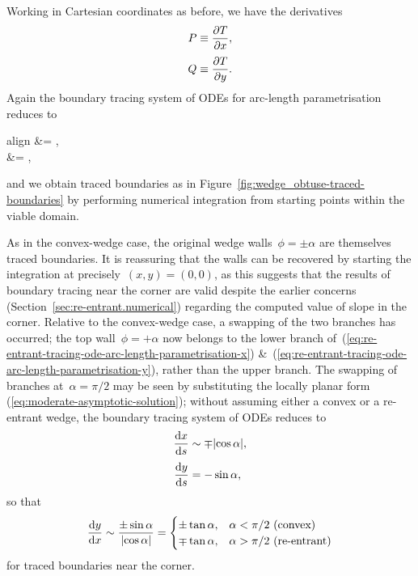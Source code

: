 \begin{figure}
\end{figure}

Working in Cartesian coordinates as before,
we have the derivatives
\begin{align}
  P &\ideq \pder{T}{x},
    \label{eq:re-entrant-gradient-x-component} \\[\tallspace]
  Q &\ideq \pder{T}{y}.
    \label{eq:re-entrant-gradient-y-component}
\end{align}
Again the boundary tracing system of ODEs for arc-length parametrisation
reduces to
\begin{important}{align}
   &= ,
    \label{eq:re-entrant-tracing-ode-arc-length-parametrisation-x}
    \\[\tallspace]
   &= ,
    \label{eq:re-entrant-tracing-ode-arc-length-parametrisation-y}
\end{important}
and we obtain traced boundaries
as in Figure~\ref{fig:wedge_obtuse-traced-boundaries}
by performing numerical integration
from starting points within the viable domain.

As in the convex-wedge case,
the original wedge walls~$\phi = \pm\alpha$
are themselves traced boundaries.
It is reassuring that the walls can be recovered
by starting the integration at precisely~$(x, y) = (0, 0)$,
as this suggests that the results of boundary tracing near the corner
are valid
despite the earlier concerns (Section~\ref{sec:re-entrant.numerical})
regarding the computed value of slope in the corner.
Relative to the convex-wedge case,
a swapping of the two branches has occurred;
the top wall~$\phi = +\alpha$ now belongs to the lower branch
of~(\ref{eq:re-entrant-tracing-ode-arc-length-parametrisation-x})
\&~(\ref{eq:re-entrant-tracing-ode-arc-length-parametrisation-y}),
rather than the upper branch.
The swapping of branches at~$\alpha = \pi/2$ may be seen
by substituting the locally planar form~%
  (\ref{eq:moderate-asymptotic-solution});
without assuming either a convex or a re-entrant wedge,
the boundary tracing system of ODEs reduces to
\begin{align}
  \tder{x}{s} &\asy \mp \abs{\cos\alpha},
    \label{eq:planar-asymptotic-tracing-ode-arc-length-parametrisation-x}
    \\[\tallspace]
  \tder{y}{s} &= -\sin\alpha,
    \label{eq:planar-asymptotic-tracing-ode-arc-length-parametrisation-y}
\end{align}
so that
\begin{equation}
  \tder{y}{x} \asy \frac{\pm\sin\alpha}{\abs{\cos\alpha}} =
    \begin{cases}
      \pm\tan\alpha, &\text{$\alpha < \pi/2$ (convex)} \\
      \mp\tan\alpha, &\text{$\alpha > \pi/2$ (re-entrant)}
    \end{cases}
  \label{eq:planar-asymptotic-tracing-ode-coordinate-parametrisation-y}
\end{equation}
for traced boundaries near the corner.

